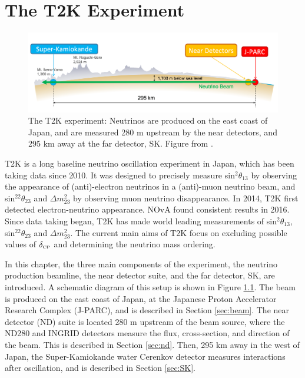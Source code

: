 \chapter{The T2K Experiment}\label{sec:T2K}

\begin{figure}[h]
\centering
\includegraphics*[width=1.0\textwidth,clip]{figs/t2kcrosssection}
\caption{The T2K experiment: Neutrinos are produced on the east coast of Japan, and are measured 280 m upstream by the near detectors, and 295 km away at the far detector, SK. Figure from \cite{tript}.} \label{t2kcrosssec}
\end{figure}

T2K is a long baseline neutrino oscillation experiment in Japan, which has been taking data since 2010. It was designed to precisely measure sin$^2\theta_{13}$ by observing the appearance of (anti)-electron neutrinos in a (anti)-muon neutrino beam, and sin$^22\theta_{23}$ and $\Delta m^2_{23}$ by observing muon neutrino disappearance. In 2014, T2K first detected electron-neutrino appearance\cite{nova2016}. NOvA found consistent results in 2016\cite{PhysRevLett.112.061802}. Since data taking began, T2K has made world leading measurements of sin$^2\theta_{13}$, sin$^22\theta_{23}$ and $\Delta m^2_{23}$. The current main aims of T2K focus on excluding possible values of $\delta_{\scriptscriptstyle\mathrm{CP}}$ and determining the neutrino mass ordering.

In this chapter, the three main components of the experiment, the neutrino production beamline, the near detector suite, and the far detector, SK, are introduced. A schematic diagram of this setup is shown in Figure \ref{t2kcrosssec}. The beam is produced on the east coast of Japan, at the Japanese Proton Accelerator Research Complex (J-PARC), and is described in Section \ref{sec:beam}. The near detector (ND) suite is located 280 m upstream of the beam source, where the ND280 and INGRID detectors measure the flux, cross-section, and direction of the beam. This is described in Section \ref{sec:nd}. Then, 295 km away in the west of Japan, the Super-Kamiokande water Cerenkov detector measures interactions after oscillation, and is described in Section \ref{sec:SK}.

